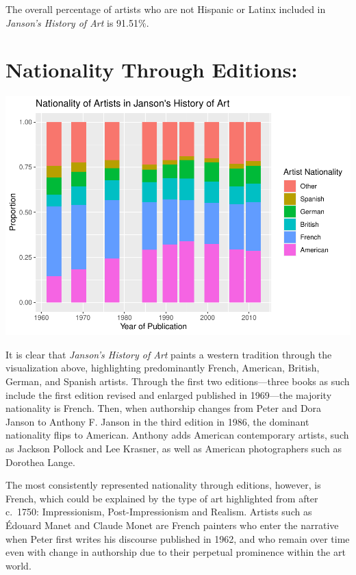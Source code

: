 \documentclass[
  letterpaper,
  DIV=11,
  numbers=noendperiod]{scrreprt}
\begin{document}
The overall percentage of artists who are not Hispanic or Latinx
included in \emph{Janson's History of Art} is 91.51\%.

\hypertarget{nationality-through-editions}{%
\section{\texorpdfstring{\textbf{Nationality Through
Editions:}}{Nationality Through Editions:}}\label{nationality-through-editions}}

\includegraphics{Chapter1/Chapter1_files/figure-pdf/jansonnationalitythroughtime-1.pdf}

It is clear that \emph{Janson's History of Art} paints a western
tradition through the visualization above, highlighting predominantly
French, American, British, German, and Spanish artists. Through the
first two editions---three books as such include the first edition
revised and enlarged published in 1969---the majority nationality is
French. Then, when authorship changes from Peter and Dora Janson to
Anthony F. Janson in the third edition in 1986, the dominant nationality
flips to American. Anthony adds American contemporary artists, such as
Jackson Pollock and Lee Krasner, as well as American photographers such
as Dorothea Lange.

The most consistently represented nationality through editions, however,
is French, which could be explained by the type of art highlighted from
after c.~1750: Impressionism, Post-Impressionism and Realism. Artists
such as Édouard Manet and Claude Monet are French painters who enter the
narrative when Peter first writes his discourse published in 1962, and
who remain over time even with change in authorship due to their
perpetual prominence within the art world.
\end{document}
